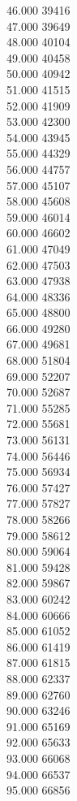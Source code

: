 { 46.000	39416 \\
 47.000	39649 \\
 48.000	40104 \\
 49.000	40458 \\
 50.000	40942 \\
 51.000	41515 \\
 52.000	41909 \\
 53.000	42300 \\
 54.000	43945 \\
 55.000	44329 \\
 56.000	44757 \\
 57.000	45107 \\
 58.000	45608 \\
 59.000	46014 \\
 60.000	46602 \\
 61.000	47049 \\
 62.000	47503 \\
 63.000	47938 \\
 64.000	48336 \\
 65.000	48800 \\
 66.000	49280 \\
 67.000	49681 \\
 68.000	51804 \\
 69.000	52207 \\
 70.000	52687 \\
 71.000	55285 \\
 72.000	55681 \\
 73.000	56131 \\
 74.000	56446 \\
 75.000	56934 \\
 76.000	57427 \\
 77.000	57827 \\
 78.000	58266 \\
 79.000	58612 \\
 80.000	59064 \\
 81.000	59428 \\
 82.000	59867 \\
 83.000	60242 \\
 84.000	60666 \\
 85.000	61052 \\
 86.000	61419 \\
 87.000	61815 \\
 88.000	62337 \\
 89.000	62760 \\
 90.000	63246 \\
 91.000	65169 \\
 92.000	65633 \\
 93.000	66068 \\
 94.000	66537 \\
 95.000	66856 \\
}
